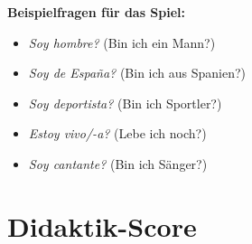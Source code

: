 \documentclass[11pt,a4paper]{article}
\begin{document}
\textbf{Beispielfragen für das Spiel:}
\begin{itemize}
    \item \textit{\textquestiondown{}Soy hombre?} (Bin ich ein Mann?)
    \item \textit{\textquestiondown{}Soy de España?} (Bin ich aus Spanien?)
    \item \textit{\textquestiondown{}Soy deportista?} (Bin ich Sportler?)
    \item \textit{\textquestiondown{}Estoy vivo/-a?} (Lebe ich noch?)
    \item \textit{\textquestiondown{}Soy cantante?} (Bin ich Sänger?)
\end{itemize}

\newpage
\section{Didaktik-Score}
\end{document}
